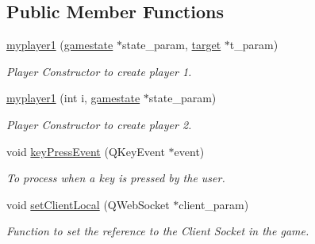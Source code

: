 \subsection*{Public Member Functions}
\begin{DoxyCompactItemize}
\item 
\hyperlink{classmyplayer1_a432fa3b50d94486945e6632035fdb79c}{myplayer1} (\hyperlink{classgamestate}{gamestate} $\ast$state\+\_\+param, \hyperlink{classtarget}{target} $\ast$t\+\_\+param)
\begin{DoxyCompactList}\small\item\em Player Constructor to create player 1. \end{DoxyCompactList}\item 
\mbox{\label{classmyplayer1_a0313d001b5c663fc875c440cbafaefe0}} 
\hyperlink{classmyplayer1_a0313d001b5c663fc875c440cbafaefe0}{myplayer1} (int i, \hyperlink{classgamestate}{gamestate} $\ast$state\+\_\+param)
\begin{DoxyCompactList}\small\item\em Player Constructor to create player 2. \end{DoxyCompactList}\item 
\mbox{\label{classmyplayer1_a12d8f91b8542cf36072da7ff7b9ad524}} 
void \hyperlink{classmyplayer1_a12d8f91b8542cf36072da7ff7b9ad524}{key\+Press\+Event} (Q\+Key\+Event $\ast$event)
\begin{DoxyCompactList}\small\item\em To process when a key is pressed by the user. \end{DoxyCompactList}\item 
\mbox{\label{classmyplayer1_a94d95265e865928930664ef94fdc640b}} 
void \hyperlink{classmyplayer1_a94d95265e865928930664ef94fdc640b}{set\+Client\+Local} (Q\+Web\+Socket $\ast$client\+\_\+param)
\begin{DoxyCompactList}\small\item\em Function to set the reference to the Client Socket in the game. \end{DoxyCompactList}\end{DoxyCompactItemize}
